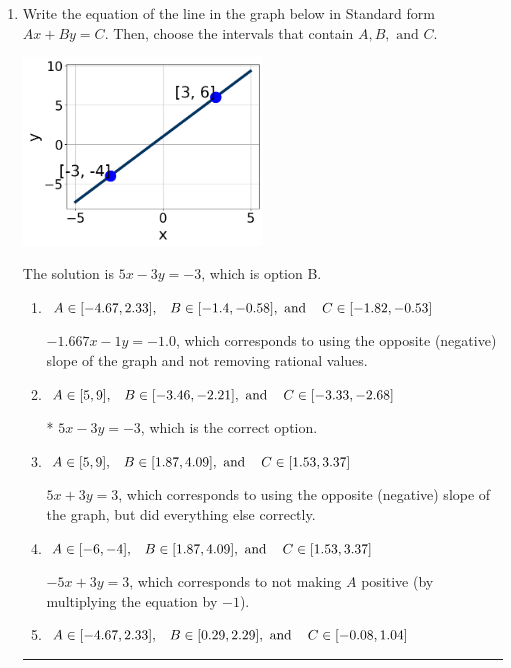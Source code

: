 \documentclass{extbook}[14pt]
\newcommand{\litem}[1]{\item #1

\rule{\textwidth}{0.4pt}}
\begin{document}
\begin{enumerate}\litem{
Write the equation of the line in the graph below in Standard form $Ax+By=C$. Then, choose the intervals that contain $A, B, \text{ and } C$.

\begin{center}
    \includegraphics[width=0.5\textwidth]{../Figures/linearGraphToStandardB.png}
\end{center}




The solution is \( 5x - 3y = -3 \), which is option B.\begin{enumerate}[label=\Alph*.]
\item \( A \in [-4.67, 2.33], \hspace{3mm} B \in [-1.4, -0.58], \text{ and } \hspace{3mm} C \in [-1.82, -0.53] \)

 $-1.667x - 1y = -1.0$, which corresponds to using the opposite (negative) slope of the graph and not removing rational values.
\item \( A \in [5, 9], \hspace{3mm} B \in [-3.46, -2.21], \text{ and } \hspace{3mm} C \in [-3.33, -2.68] \)

* $5x - 3y = -3$, which is the correct option.
\item \( A \in [5, 9], \hspace{3mm} B \in [1.87, 4.09], \text{ and } \hspace{3mm} C \in [1.53, 3.37] \)

 $5x + 3y = 3$, which corresponds to using the opposite (negative) slope of the graph, but did everything else correctly.
\item \( A \in [-6, -4], \hspace{3mm} B \in [1.87, 4.09], \text{ and } \hspace{3mm} C \in [1.53, 3.37] \)

 $-5x + 3y = 3$, which corresponds to not making $A$ positive (by multiplying the equation by $-1$).
\item \( A \in [-4.67, 2.33], \hspace{3mm} B \in [0.29, 2.29], \text{ and } \hspace{3mm} C \in [-0.08, 1.04] \)


\end{enumerate}}
\end{enumerate}
\end{document}
